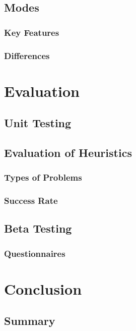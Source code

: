 \documentclass{l4proj}
\begin{document}
\section{Modes}

\subsection{Key Features}


\subsection{Differences}




\chapter{Evaluation}


\section{Unit Testing}

\section{Evaluation of Heuristics}
\subsection{Types of Problems}
\subsection{Success Rate}

\section{Beta Testing}
\subsection{Questionnaires}






\chapter{Conclusion}

\section{Summary}
\end{document}
